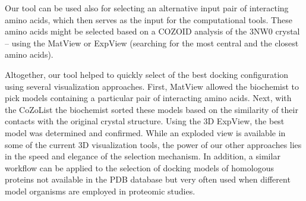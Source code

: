 \documentclass{bmcart}
\begin{document}
Our tool can be used also for selecting an alternative input pair of interacting amino acids, which then serves as the input for the computational tools.
These amino acids might be selected based on a COZOID analysis of the 3NW0 crystal -- using the MatView or ExpView (searching for the most central and the closest amino acids).

Altogether, our tool helped to quickly select of the best docking configuration using several visualization approaches. 
First, MatView allowed the biochemist to pick models containing a particular pair of interacting amino acids. 
Next, with the CoZoList the biochemist sorted these models based on the similarity of their contacts with the original crystal structure. 
Using the 3D ExpView, the best model was determined and confirmed. 
While an exploded view is available in some of the current 3D visualization tools, the power of our other approaches lies in the speed and elegance of the selection mechanism. 
In addition, a similar workflow can be applied to the selection of docking models of homologous proteins not available in the PDB database but very often used when different model organisms are employed in proteomic studies.





\end{document}
